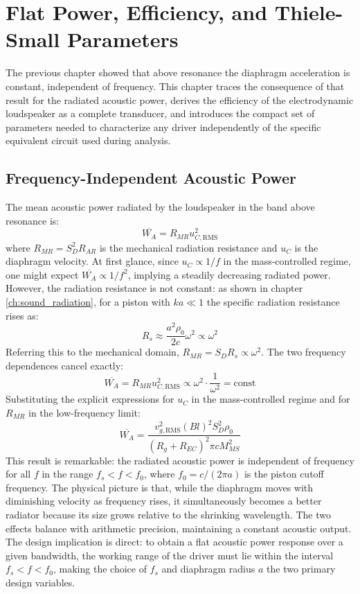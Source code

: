 
\graphicspath{{00_Images/08_chapter/}}

\chapter{Flat Power, Efficiency, and Thiele-Small Parameters}
\label{ch:efficiency}

The previous chapter showed that above resonance the diaphragm acceleration is constant, independent of frequency.
This chapter traces the consequence of that result for the radiated acoustic power, derives the efficiency of the electrodynamic loudspeaker as a complete transducer, and introduces the compact set of parameters needed to characterize any driver independently of the specific equivalent circuit used during analysis.

\section{Frequency-Independent Acoustic Power}
\label{sc:81}

The mean acoustic power radiated by the loudspeaker in the band above resonance is:
\[
\overline{W_A} = R_{MR} u_{C,\mathrm{RMS}}^2
\]
where \(R_{MR} = S_D^2 R_{AR}\) is the mechanical radiation resistance and \(u_C\) is the diaphragm velocity.
At first glance, since \(u_C \propto 1/f\) in the mass-controlled regime, one might expect \(\overline{W_A} \propto 1/f^2\), implying a steadily decreasing radiated power.
However, the radiation resistance is not constant: as shown in chapter \ref{ch:sound_radiation}, for a piston with \(ka \ll 1\) the specific radiation resistance rises as:
\[
R_s \approx \frac{a^2 \rho_0}{2c} \omega^2 \propto \omega^2
\]
Referring this to the mechanical domain, \(R_{MR} = S_D R_s \propto \omega^2\).
The two frequency dependences cancel exactly:
\[
\overline{W_A} = R_{MR} u_{C,\mathrm{RMS}}^2 \propto \omega^2 \cdot \frac{1}{\omega^2} = \text{const}
\]
Substituting the explicit expressions for \(u_C\) in the mass-controlled regime and for \(R_{MR}\) in the low-frequency limit:
\begin{equation}
    \overline{W_A} = \frac{v_{g,\mathrm{RMS}}^2 (Bl)^2 S_D^2 \rho_0}{(R_g + R_{EC})^2 \pi c M_{MS}^2}
    \label{eq:flatPower}
\end{equation}
This result is remarkable: the radiated acoustic power is independent of frequency for all \(f\) in the range \(f_s < f < f_0\), where \(f_0 = c/(2\pi a)\) is the piston cutoff frequency.
The physical picture is that, while the diaphragm moves with diminishing velocity as frequency rises, it simultaneously becomes a better radiator because its size grows relative to the shrinking wavelength.
The two effects balance with arithmetic precision, maintaining a constant acoustic output.
The design implication is direct: to obtain a flat acoustic power response over a given bandwidth, the working range of the driver must lie within the interval \(f_s < f < f_0\), making the choice of \(f_s\) and diaphragm radius \(a\) the two primary design variables.

